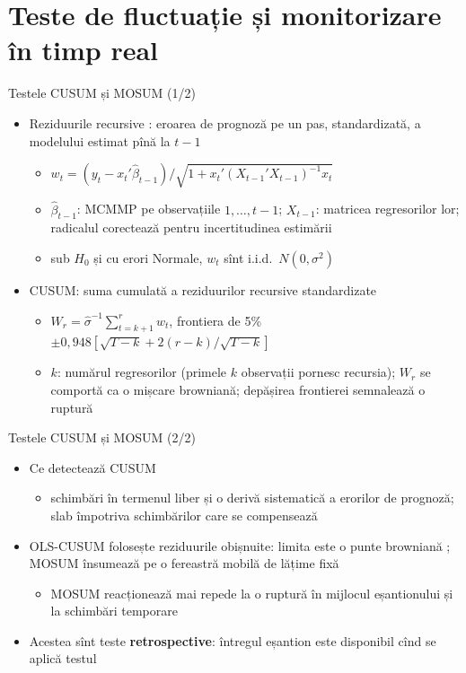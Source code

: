 \section{Teste de fluctuație și monitorizare în timp real}

\begin{frame}{Testele CUSUM și MOSUM (1/2)}
\itemsize{\small}
\begin{itemize}
    \item Reziduurile recursive : eroarea de prognoză pe un pas, standardizată, a modelului estimat pînă la $t - 1$
    \begin{itemize}
        \item $w_t = (y_t - x_t'\hat\beta_{t-1})/\sqrt{1 + x_t'(X_{t-1}'X_{t-1})^{-1}x_t}$
        \item $\hat\beta_{t-1}$: MCMMP pe observațiile $1, \dots, t - 1$; $X_{t-1}$: matricea regresorilor lor; radicalul corectează pentru incertitudinea estimării
        \item sub $H_0$ și cu erori Normale, $w_t$ sînt i.i.d.\ $N(0, \sigma^2)$
    \end{itemize}
    \item CUSUM: suma cumulată a reziduurilor recursive standardizate
    \begin{itemize}
        \item $W_r = \hat\sigma^{-1}\sum_{t = k+1}^{r} w_t$, frontiera de 5\% $\pm 0{,}948[\sqrt{T - k} + 2(r - k)/\sqrt{T - k}]$
        \item $k$: numărul regresorilor (primele $k$ observații pornesc recursia); $W_r$ se comportă ca o mișcare browniană; depășirea frontierei semnalează o ruptură
    \end{itemize}
\end{itemize}
\end{frame}

\begin{frame}{Testele CUSUM și MOSUM (2/2)}
\itemsize{\small}
\begin{itemize}
    \item Ce detectează CUSUM
    \begin{itemize}
        \item schimbări în termenul liber și o derivă sistematică a erorilor de prognoză; slab împotriva schimbărilor care se compensează
    \end{itemize}
    \item OLS-CUSUM folosește reziduurile obișnuite: limita este o punte browniană ; MOSUM însumează pe o fereastră mobilă de lățime fixă 
    \begin{itemize}
        \item MOSUM reacționează mai repede la o ruptură în mijlocul eșantionului și la schimbări temporare
    \end{itemize}
    \item Acestea sînt teste \textbf{retrospective}: întregul eșantion este disponibil cînd se aplică testul
\end{itemize}
\end{frame}

